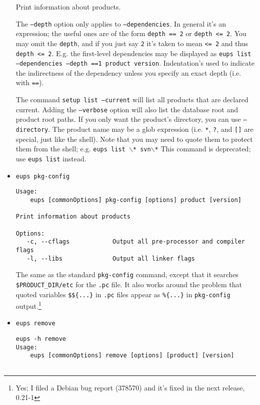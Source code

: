 \documentclass{article}
\newcommand{\code}[1]{\texttt{#1}}
\begin{document}
\begin{itemize}
Print information about products.

The \code{--depth} option only applies to \code{--dependencies}. In general it's
an expression; the useful ones are of the form \code{depth == 2} or \code{depth <= 2}.
You may omit the \code{depth}, and if you just say \code{2} it's taken to mean \code{<= 2}
and thus \code{depth <= 2}.  E.g. the first-level dependencies may be displayed as
\code{eups list --dependencies --depth ==1 product version}.  Indentation's used to
indicate the indirectness of the dependency unless you specify an exact depth (i.e. with \code{==}).

The command \code{setup list --current} will list all products that
are declared current. Adding the \code{--verbose} option will also
list the database root and product root paths.  If you only want the product's
directory, you can use \code{--directory}.
The product name may be a glob expression (i.e. \code{*}, \code{?},
and \code{[]} are special, just like the shell).  Note that you may
need to quote them to protect them from the shell; e.g. \code{eups list $\backslash$* svn$\backslash$*}
This command is deprecated; use \code{eups list} instead.


\item \code{eups pkg-config}
\begin{verbatim}
Usage:
    eups [commonOptions] pkg-config [options] product [version]

Print information about products

Options:
   -c, --cflags            Output all pre-processor and compiler flags
   -l, --libs              Output all linker flags
\end{verbatim}

The same as the standard \code{pkg-config} command, except that it
searches \code{\$PRODUCT\_DIR/etc} for the \code{.pc} file.  It also
works around the problem that quoted variables \code{\$\$\{...\}}
in \code{.pc} files appear as \code{\%\{...\}} in \code{pkg-config} output.\footnote{
  Yes; I filed a Debian bug report (378570) and it's fixed in the next release, 0.21-1}
  

\item \code{eups remove}
\begin{verbatim}
eups -h remove
Usage:
    eups [commonOptions] remove [options] [product] [version]


\end{verbatim}
\end{itemize}
\end{document}
